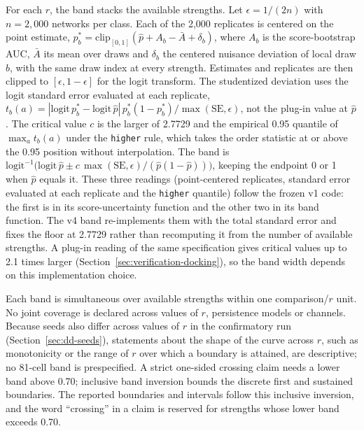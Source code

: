 For each $r$, the band stacks the available strengths. Let $\epsilon=1/(2n)$ with $n=2{,}000$ networks per class. Each of the 2,000 replicates is centered on the point estimate, $p^*_b=\mathrm{clip}_{[0,1]}(\hat p+A_b-\bar A+\delta_b)$, where $A_b$ is the score-bootstrap AUC, $\bar A$ its mean over draws and $\delta_b$ the centered nuisance deviation of local draw $b$, with the same draw index at every strength. Estimates and replicates are then clipped to $[\epsilon,1-\epsilon]$ for the logit transform. The studentized deviation uses the logit standard error evaluated at each replicate, $t_b(a)=|\mathrm{logit}\,p^*_b-\mathrm{logit}\,\hat p|\,p^*_b(1-p^*_b)/\max(\mathrm{SE},\epsilon)$, not the plug-in value at $\hat p$. The critical value $c$ is the larger of 2.7729 and the empirical 0.95 quantile of $\max_a t_b(a)$ under the \texttt{higher} rule, which takes the order statistic at or above the 0.95 position without interpolation. The band is $\mathrm{logit}^{-1}\bigl(\mathrm{logit}\,\hat p\pm c\,\max(\mathrm{SE},\epsilon)/(\hat p(1-\hat p))\bigr)$, keeping the endpoint 0 or 1 when $\hat p$ equals it. These three readings (point-centered replicates, standard error evaluated at each replicate and the \texttt{higher} quantile) follow the frozen v1 code: the first is in its score-uncertainty function and the other two in its band function. The v4 band re-implements them with the total standard error and fixes the floor at 2.7729 rather than recomputing it from the number of available strengths. A plug-in reading of the same specification gives critical values up to 2.1 times larger (Section~\ref{sec:verification-docking}), so the band width depends on this implementation choice.

Each band is simultaneous over available strengths within one comparison/$r$ unit. No joint coverage is declared across values of $r$, persistence models or channels. Because seeds also differ across values of $r$ in the confirmatory run (Section~\ref{sec:dd-seeds}), statements about the shape of the curve across $r$, such as monotonicity or the range of $r$ over which a boundary is attained, are descriptive; no 81-cell band is prespecified. A strict one-sided crossing claim needs a lower band above 0.70; inclusive band inversion bounds the discrete first and sustained boundaries. The reported boundaries and intervals follow this inclusive inversion, and the word ``crossing'' in a claim is reserved for strengths whose lower band exceeds 0.70.

